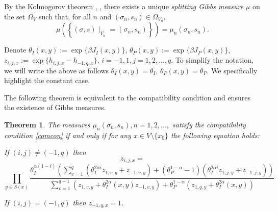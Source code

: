 \documentclass[sn-mathphys]{sn-jnl}%
\theoremstyle{thmstyleone}%
\newtheorem{theorem}{Theorem}%
\theoremstyle{thmstyletwo}%
\theoremstyle{thmstylethree}%
\begin{document}
By the Kolmogorov theorem \cite{Athreya}, \cite{Haydarov}, there exists a unique \emph{splitting Gibbs measure} ${\mu}$ on the set $\Omega_V$
such that, for all $n$ and $(\sigma _{n},s_n) \in {\Omega _{{V_{n}}}}$, $${\mu}\left( {\left\{ {(\sigma, s)\mid_{V_n}=(\sigma_n,s_n)} \right\}} \right) = \mu_{n}(\sigma_n, s_n). $$

Denote  $\theta_{I}(x,y):=\exp\{\beta J_{I}(x,y)\}$, $\theta_{P}(x,y):=\exp\{\beta J_{P}(x,y)\}$, $z_{i,j,x}:=\exp\{h_{i,j,x}-h_{-1,q,x}\}$, $i=-1,1, j=1,2,...,q$.
To simplify the notation, we will write the above as follows $\theta_{I}(x,y)=\theta_{I}$, $\theta_{P}(x,y)=\theta_{P}$. We specifically highlight the constant case.

The following theorem is equivalent to the compatibility condition and ensures the existence of Gibbs measures.
\begin{theorem}\label{comp.eq} The measures $\mu_{n}(\sigma_n, s_n), n=1,2,...,$ satisfy the compatibility condition \eqref{comcon} if and only if for any $x\in V\setminus\{x_0\}$ the following equation holds:

If $(i,j)\neq(-1,q)$ then
$$z_{i,j,x}=$$
\begin{equation}\label{funceq}
\prod\limits_{y\in S(x)}\frac{\theta_{I}^{\alpha (1-i)}\left(\sum\limits_{v=1}^{q}\left(\theta_{I}^{2\alpha i}z_{1,v,y}+z_{-1,v,y} \right)+\left(\theta_{P}^{1-\alpha}-1\right)\left(\theta_{I}^{2\alpha i}z_{1,j,y}+z_{-1,j,y}\right)\right) }{\sum\limits_{v=1}^{q-1}\left(z_{1,v,y}+\theta_{I}^{2\alpha }(x,y)z_{-1,v,y} \right)+\theta_{P}^{1-\alpha}\left(z_{1,q,y}+\theta_{I}^{2\alpha }(x,y)\right)}\end{equation}

If $(i,j)=(-1,q)$ then  $z_{-1,q,x}=1$.
\end{theorem}
\end{document}
